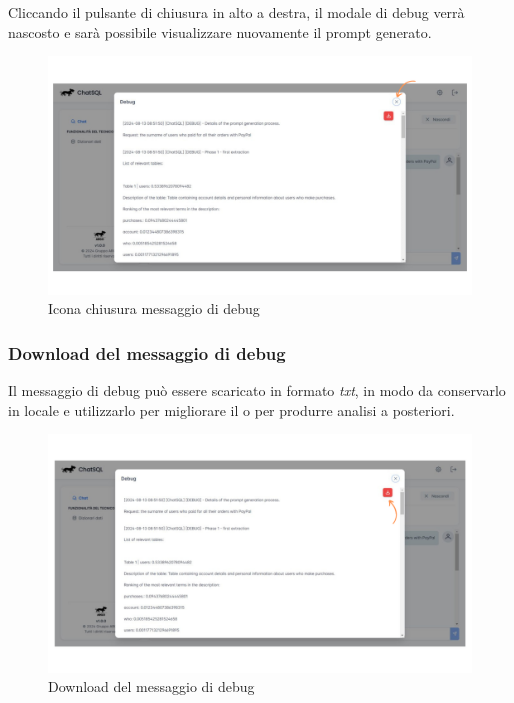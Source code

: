 \par Cliccando il pulsante di chiusura in alto a destra, il modale di debug verrà nascosto e sarà possibile visualizzare nuovamente il prompt generato.
\begin{figure}[H]
  \centering
  \includegraphics[width=\textwidth]{assets/tasto_close_debug.png}
  \caption{Icona chiusura messaggio di debug}
\end{figure}

\subsubsection{Download del messaggio di debug}

Il messaggio di debug può essere scaricato in formato \textit{txt}, in modo da conservarlo in locale e utilizzarlo per migliorare il  o per produrre analisi a posteriori.
\begin{figure}[H]
  \centering
  \includegraphics[width=\textwidth]{assets/tasto_dawnload_debug.png}
  \caption{Download del messaggio di debug}
\end{figure}





